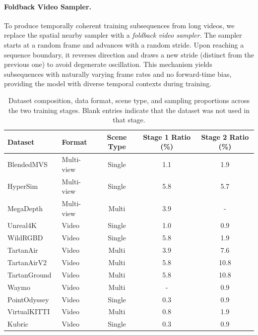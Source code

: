 \paragraph{Foldback Video Sampler.}
To produce temporally coherent training subsequences from long videos,
we replace the spatial nearby sampler with a \emph{foldback video
sampler}.
The sampler starts at a random frame and advances with a random stride.
Upon reaching a sequence boundary, it reverses direction and draws a new
stride (distinct from the previous one) to avoid degenerate oscillation.
This mechanism yields subsequences with naturally varying frame rates
and no forward-time bias, providing the model with diverse temporal
contexts during training.

\begin{table}[t]
\centering
\caption{Dataset composition, data format, scene type, and sampling proportions across the two training stages. Blank entries indicate that the dataset was not used in that stage.}
\label{tab:dataset_composition}
\begin{tabular}{llc | cc}
\toprule
Dataset & Format & Scene Type & Stage 1 Ratio (\%) & Stage 2 Ratio (\%) \\
\midrule
BlendedMVS~\cite{yao2020blendedmvs}     & Multi-view & Single & 1.1  & 1.9  \\
HyperSim~\cite{roberts2021hypersim}       & Multi-view & Single & 5.8  & 5.7  \\
MegaDepth~\cite{li2018megadepth}      & Multi-view & Multi  & 3.9  & -    \\
Unreal4K~\cite{tosi2021smd}       & Video      & Single & 1.0  & 0.9  \\
WildRGBD~\cite{xia2024rgbd}       & Video      & Single & 5.8  & 1.9  \\
TartanAir~\cite{wang2020tartanair}      & Video      & Multi  & 3.9  & 7.6  \\
TartanAirV2~\cite{wang2020tartanair}    & Video      & Multi  & 5.8  & 10.8 \\
TartanGround~\cite{patel2025tartanground} & Video     & Multi  & 5.8  & 10.8 \\
Waymo~\cite{sun2020scalability}        & Video      & Multi  & -    & 0.9  \\
PointOdyssey~\cite{zheng2023pointodyssey}   & Video      & Single & 0.3  & 0.9  \\
VirtualKITTI~\cite{cabon2020virtual}  & Video      & Multi  & 0.8  & 1.9  \\
Kubric~\cite{greff2022kubric}         & Video      & Single & 0.3  & 0.9  \\

\end{tabular}
\end{table}
